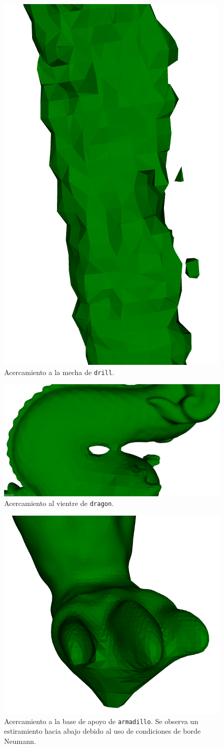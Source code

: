 		\begin{figure}
			\centering
			\includegraphics[max width=.5\linewidth, max height=.25\textheight, keepaspectratio]
				{img/drill_drops}
			\caption[Acercamiento a la mecha de \texttt{drill}]{\label{fig:drill_drops}Acercamiento a la mecha de \texttt{drill}.}
		\end{figure}

		\begin{figure}
			\centering
			\includegraphics[max width=.5\linewidth, max height=.25\textheight, keepaspectratio]
				{img/dragon_belly}
			\caption[Acercamiento al vientre de \texttt{dragon}]{\label{fig:dragon_belly}Acercamiento al vientre de \texttt{dragon}.}
		\end{figure}

		\begin{figure}
			\centering
			\includegraphics[max width=.5\linewidth, max height=.25\textheight, keepaspectratio]
				{img/arma_foot}
			\caption[Acercamiento a la base de apoyo de \texttt{armadillo}]{\label{fig:base}Acercamiento a la base de apoyo de \texttt{armadillo}. Se observa un estiramiento hacia abajo debido al uso de condiciones de borde Neumann.}
		\end{figure}

